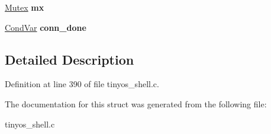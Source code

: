 \begin{DoxyCompactItemize}
\item 
\hypertarget{struct____rs__globals_ae6f58855b0c5911cacb493a1f305c9e3}{\hyperlink{group__syscalls_gaef2ec62cae8e0031fd19fc8b91083ade}{Mutex} {\bfseries mx}}\label{struct____rs__globals_ae6f58855b0c5911cacb493a1f305c9e3}

\item 
\hypertarget{struct____rs__globals_acded897204308c539cab184093cd6207}{\hyperlink{structCondVar}{Cond\-Var} {\bfseries conn\-\_\-done}}\label{struct____rs__globals_acded897204308c539cab184093cd6207}

\end{DoxyCompactItemize}


\subsection{Detailed Description}


Definition at line 390 of file tinyos\-\_\-shell.\-c.



The documentation for this struct was generated from the following file\-:\begin{DoxyCompactItemize}
\item 
tinyos\-\_\-shell.\-c\end{DoxyCompactItemize}
